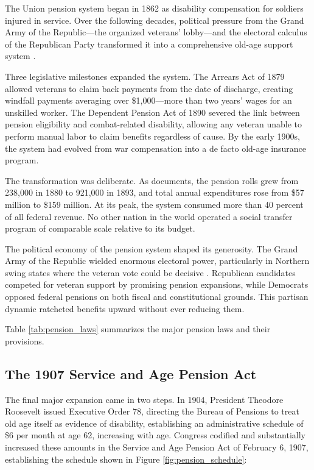 \documentclass[12pt]{article}
\begin{document}
The Union pension system began in 1862 as disability compensation for soldiers injured in service. Over the following decades, political pressure from the Grand Army of the Republic---the organized veterans' lobby---and the electoral calculus of the Republican Party transformed it into a comprehensive old-age support system \citep{skocpol1992protecting, skocpol1993americas}.

Three legislative milestones expanded the system. The Arrears Act of 1879 allowed veterans to claim back payments from the date of discharge, creating windfall payments averaging over \$1,000---more than two years' wages for an unskilled worker. The Dependent Pension Act of 1890 severed the link between pension eligibility and combat-related disability, allowing any veteran unable to perform manual labor to claim benefits regardless of cause. By the early 1900s, the system had evolved from war compensation into a de facto old-age insurance program.

The transformation was deliberate. As \citet{glasson1918federal} documents, the pension rolls grew from 238,000 in 1880 to 921,000 in 1893, and total annual expenditures rose from \$57 million to \$159 million. At its peak, the system consumed more than 40 percent of all federal revenue. No other nation in the world operated a social transfer program of comparable scale relative to its budget.

The political economy of the pension system shaped its generosity. The Grand Army of the Republic wielded enormous electoral power, particularly in Northern swing states where the veteran vote could be decisive \citep{skocpol1993americas}. Republican candidates competed for veteran support by promising pension expansions, while Democrats opposed federal pensions on both fiscal and constitutional grounds. This partisan dynamic ratcheted benefits upward without ever reducing them.

Table \ref{tab:pension_laws} summarizes the major pension laws and their provisions.



\subsection{The 1907 Service and Age Pension Act}

The final major expansion came in two steps. In 1904, President Theodore Roosevelt issued Executive Order 78, directing the Bureau of Pensions to treat old age itself as evidence of disability, establishing an administrative schedule of \$6 per month at age 62, increasing with age. Congress codified and substantially increased these amounts in the Service and Age Pension Act of February 6, 1907, establishing the schedule shown in Figure \ref{fig:pension_schedule}:
\end{document}
